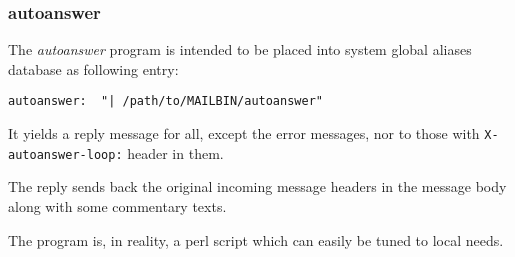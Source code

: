\subsubsection{autoanswer}



The {\em autoanswer\/} program is intended to be placed into
system global aliases database as following entry:

\begin{verbatim}
autoanswer:  "| /path/to/MAILBIN/autoanswer"
\end{verbatim}


It yields a reply message for all, except the error messages, nor
to those with {\tt X-autoanswer-loop:} header in them.

The reply sends back the original incoming message headers in the
message body along with some commentary texts.

The program is, in reality, a perl script which can easily be tuned
to local needs.

